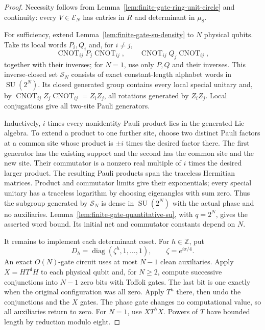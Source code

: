 \documentclass[11pt]{article}
\begin{document}
\begin{proof}
Necessity follows from Lemma~\ref{lem:finite-gate-ring-unit-circle}
and continuity: every $V\in\mathcal E_N$ has entries in $R$ and determinant
in $\mu_8$.

For sufficiency, extend Lemma~\ref{lem:finite-gate-su-density} to $N$
physical qubits. Take its local words $P_i,Q_i$ and, for $i\ne j$,
\[
 \operatorname{CNOT}_{ij}P_j\operatorname{CNOT}_{ij},\qquad
 \operatorname{CNOT}_{ij}Q_j\operatorname{CNOT}_{ij},
\]
together with their inverses; for $N=1$, use only $P,Q$ and their inverses.
This inverse-closed set $\mathcal S_N$ consists of exact constant-length
alphabet words in $\operatorname{SU}(2^N)$. Its closed generated group
contains every local special unitary and, by
$\operatorname{CNOT}_{ij}Z_j\operatorname{CNOT}_{ij}=Z_iZ_j$, all rotations
generated by $Z_iZ_j$. Local conjugations give all two-site Pauli generators.

Inductively, $i$ times every nonidentity Pauli product lies in the generated
Lie algebra. To extend a product to one further site, choose two distinct
Pauli factors at a common site whose product is $\pm i$ times the desired
factor there. The first generator has the existing support and the second
has the common site and the new site. Their commutator is a nonzero real
multiple of $i$ times the desired larger product. The resulting Pauli
products span the traceless Hermitian matrices. Product and commutator
limits give their exponentials; every special unitary has a traceless
logarithm by choosing eigenangles with sum zero. Thus the subgroup generated
by $\mathcal S_N$ is dense in $\operatorname{SU}(2^N)$ with the actual phase
and no auxiliaries.
Lemma~\ref{lem:finite-gate-quantitative-su}, with $q=2^N$, gives the asserted
word bound. Its initial net and commutator constants depend on $N$.

It remains to implement each determinant coset. For $h\in\mathbb Z$, put
\[
 D_h=\operatorname{diag}(\zeta^h,1,\ldots,1),\qquad \zeta=e^{i\pi/4}.
\]
An exact $O(N)$-gate circuit uses at most $N-1$ clean auxiliaries. Apply
$X=HT^4H$ to each physical qubit and, for $N\geq2$, compute successive
conjunctions into $N-1$ zero bits with Toffoli gates. The last bit is one
exactly when the original configuration was all zero. Apply $T^h$ there,
then undo the conjunctions and the $X$ gates. The phase gate changes no
computational value, so all auxiliaries return to zero. For $N=1$, use
$XT^hX$. Powers of $T$ have bounded length by reduction modulo eight.


\end{proof}
\end{document}
